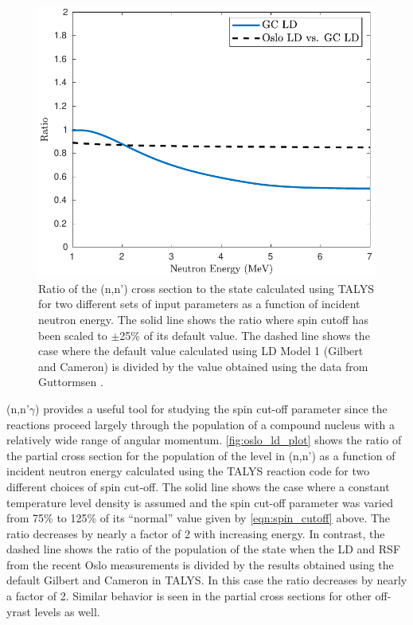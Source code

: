\documentclass[letterpaper,draft]{ar-1col}
\begin{document}
\begin{figure}
 \centering
 \includegraphics[width=0.7\linewidth]{fig3.pdf}

 \caption{Ratio of the (n,n') cross section to the state calculated using TALYS for two different sets of input parameters as a function of incident neutron energy. The solid line shows the ratio where spin cutoff has been scaled to $\pm$25\% of its default value. The dashed line shows the case where the default value calculated using LD Model 1 (Gilbert and Cameron) is divided by the value obtained using the data from Guttormsen \cite{Gut13a}.}
 \label{fig:oslo_ld_plot}
\end{figure}



(n,n'$\gamma$) provides a useful tool for studying the spin cut-off parameter since the reactions proceed largely through the population of a compound nucleus with a relatively wide range of angular momentum. \autoref{fig:oslo_ld_plot} shows the ratio of the partial cross section for the population of the  level in (n,n') as a function of incident neutron energy calculated using the TALYS reaction code for two different choices of spin cut-off.  The solid line shows the case where a constant temperature level density is assumed and the spin cut-off parameter was varied from 75\% to 125\% of its \enquote{normal} value given by \autoref{eqn:spin_cutoff} above.  The ratio decreases by nearly a factor of 2 with increasing energy.  In contrast, the dashed line shows the ratio of the  population of the  state when the LD and RSF from the recent Oslo measurements \cite{Gut13a} is divided by the results obtained using the default Gilbert and Cameron in TALYS.  In this case the ratio decreases by nearly a factor of 2.  Similar behavior is seen in the partial cross sections for other off-yrast levels as well. 
\end{document}

